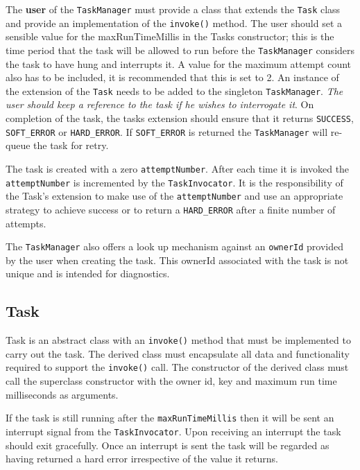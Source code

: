 The \textbf{user} of the \texttt{TaskManager} must provide a class that extends 
the \texttt{Task} class and provide an implementation of the \texttt{invoke()} 
method. The user should set a sensible value for the maxRunTimeMillis in the 
Tasks constructor; this is the time period that the task will be allowed to run 
before the \texttt{TaskManager} considers the task to have hung and interrupts 
it. A value for the maximum attempt count also has to be included, it is 
recommended that this is set to 2. An instance of the extension of the 
\texttt{Task} needs to be added to the singleton \texttt{TaskManager}. 
\textit{The user should keep a reference to the task if he wishes to 
interrogate it}. On completion of the task, the tasks extension should ensure 
that it returns \texttt{SUCCESS}, \texttt{SOFT\_ERROR} or \texttt{HARD\_ERROR}. 
If \texttt{SOFT\_ERROR} is returned the \texttt{TaskManager} will re-queue the 
task for retry.

The task is created with a zero \texttt{attemptNumber}. After each time it is 
invoked the \texttt{attemptNumber} is incremented by the 
\texttt{TaskInvocator}. It is the responsibility of the Task's extension to 
make use of the \texttt{attemptNumber} and use an appropriate strategy to 
achieve success or to return a \texttt{HARD\_ERROR} after a finite number of 
attempts.

The \texttt{TaskManager} also offers a look up mechanism against an 
\texttt{ownerId} provided by the user when creating the task. This ownerId 
associated with the task is not unique and is intended for diagnostics.

\subsection{Task}
Task is an abstract class with an \texttt{invoke()} method that must be 
implemented to carry out the task. The derived class must encapsulate all data 
and functionality required to support the \texttt{invoke()} call.  The 
constructor of the derived class must call the superclass constructor with the 
owner id,  key and maximum run time milliseconds as arguments.

If the task is still running after the \texttt{maxRunTimeMillis} then it will 
be sent an interrupt signal from the \texttt{TaskInvocator}. Upon receiving an 
interrupt the task should exit gracefully. Once an interrupt is sent the task 
will be regarded as having returned a hard error irrespective of the value it 
returns.

